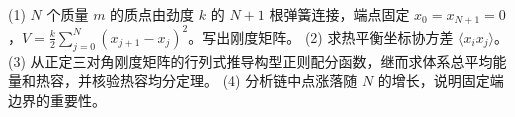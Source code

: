 (1) \(N\) 个质量 \(m\) 的质点由劲度 \(k\) 的 \(N+1\) 根弹簧连接，端点固定 \(x_0=x_{N+1}=0\)，\(V=\frac k2\sum_{j=0}^{N}(x_{j+1}-x_j)^2\)。写出刚度矩阵。
(2) 求热平衡坐标协方差 \(\langle x_i x_j\rangle\)。
(3) 从正定三对角刚度矩阵的行列式推导构型正则配分函数，继而求体系总平均能量和热容，并核验热容均分定理。
(4) 分析链中点涨落随 \(N\) 的增长，说明固定端边界的重要性。
